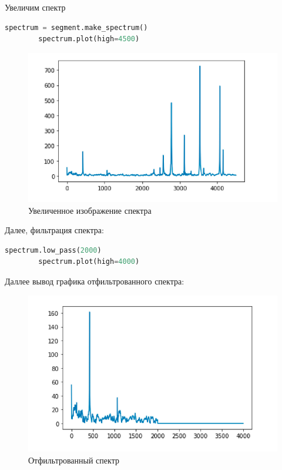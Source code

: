 \documentclass[a4]{article}
\begin{document}
    Увеличим спектр

    \begin{lstlisting}[language=Python, caption= Приближенное изображение спектра, label={lst:zoom_spectr}]
        spectrum = segment.make_spectrum()
        spectrum.plot(high=4500)
    \end{lstlisting}

    \begin{figure}[H]
        \centering
        \includegraphics[width=\textwidth]{zoomed_spectr}
        \caption{Увеличенное изображение спектра}
        \label{fig:zoomed_spectr}
    \end{figure}

    Далее, фильтрация спектра:

    \begin{lstlisting}[language=Python, caption= Фильтрация спектра, label={lst:filter_spectr}]
        spectrum.low_pass(2000)
        spectrum.plot(high=4000)
    \end{lstlisting}

    Даллее вывод графика отфильтрованного спектра:

    \begin{figure}[H]
        \centering
        \includegraphics[width=\textwidth]{filtered_spectr}
        \caption{Отфильтрованный спектр}
        \label{fig:spectr_filter}
    \end{figure}
\end{document}
